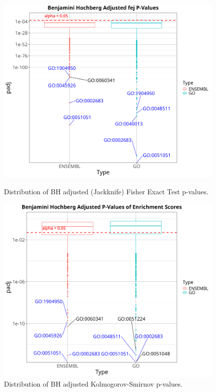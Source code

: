 \documentclass[12pt]{article}
\begin{document}
\begin{figure}[htpb]
    \centering
    \begin{minipage}{0.45\textwidth}
        \centering
        \includegraphics[width=\textwidth]{./plots/BHBoxplotFDRFEJ.png}
        \caption{Distribution of BH adjusted (Jackknife) Fisher Exact Test p-values. }
        \label{fig:boxplot-fdr-fej}
    \end{minipage}
    \hfill
    \begin{minipage}{0.45\textwidth}
        \centering
        \includegraphics[width=\textwidth]{./plots/BHBoxplotFDRKS.png}
        \caption{Distribution of BH adjusted Kolmogorov-Smirnov p-values.}
        \label{fig:boxplot-fdr-ks}
    \end{minipage}
\end{figure}
\end{document}
